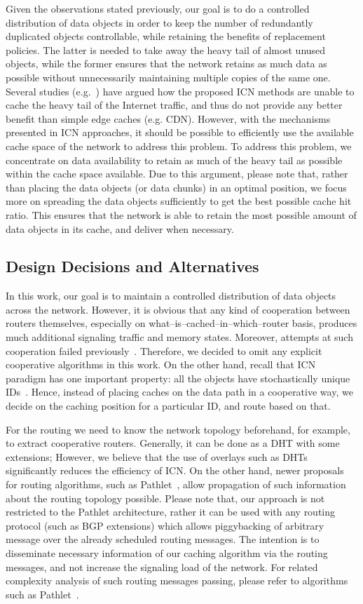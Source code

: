 \documentclass[article]{elsarticle}
\begin{document}
Given the observations stated previously, our goal is to do a controlled distribution of data objects in order to keep the number of redundantly duplicated objects controllable, while retaining the benefits of replacement policies. The latter is needed to take away the heavy tail of almost unused objects, while the former ensures that the network retains as much data as possible without unnecessarily maintaining multiple copies of the same one. Several studies (e.g.~\cite{hotnets2011}) have argued how the proposed ICN methods are unable to cache the heavy tail of the Internet traffic, and thus do not provide any better benefit than simple edge caches (e.g. CDN). However, with the mechanisms presented in ICN approaches, it should be possible to efficiently use the available cache space of the network to address this problem. To address this problem, we concentrate on data availability to retain as much of the heavy tail as possible within the cache space available. Due to this argument, please note that, rather than placing the data objects (or data chunks) in an optimal position, we focus more on spreading the data objects sufficiently to get the best possible cache hit ratio. This ensures that the network is able to retain the most possible amount of data objects in its cache, and deliver when necessary.

\subsection{Design Decisions and Alternatives}
In this work, our goal is to maintain a controlled distribution of data objects across the network. However, it is obvious that any kind of cooperation between routers themselves, especially on what--is--cached--in--which--router basis, produces much additional signaling traffic and memory states. Moreover, attempts at such cooperation failed previously~\cite{cache_coop}. Therefore, we decided to omit any explicit cooperative algorithms in this work. On the other hand, recall that ICN paradigm has one important property: all the objects have stochastically unique IDs~\cite{ccn}. Hence, instead of placing caches on the data path in a cooperative way, we decide on the caching position for a particular ID, and route based on that. 

For the routing we need to know the network topology beforehand, for example, to extract cooperative routers. Generally, it can be done as a DHT with some extensions; However, we believe that the use of overlays such as DHTs significantly reduces the efficiency of ICN. On the other hand, newer proposals for routing algorithms, such as Pathlet~\cite{pathlet}, allow propagation of such information about the routing topology possible. Please note that, our approach is not restricted to the Pathlet architecture, rather it can be used with any routing protocol (such as BGP extensions) which allows piggybacking of arbitrary message over the already scheduled routing messages. The intention is to disseminate necessary information of our caching algorithm via the routing messages, and not increase the signaling load of the network. For related complexity analysis of such routing messages passing, please refer to algorithms such as Pathlet~\cite{pathlet}. 
\end{document}
